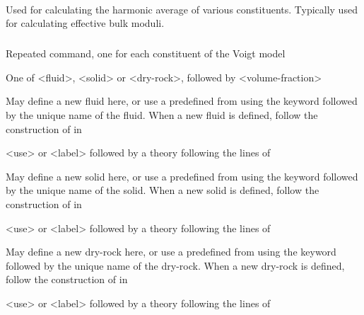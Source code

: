 {\paragraph{}
 \slist
   \item \Description Used for calculating the harmonic average of various constituents. Typically used for calculating effective bulk moduli. 
   \item \Argument
   \item \Default 
 \elist

\subparagraph{}
 \slist
   \item \Description Repeated command, one for each constituent of the Voigt model
   \item \Argument One of <fluid>, <solid> or <dry-rock>, followed by <volume-fraction>
   \item \Default
 \elist

 \slist
   \item \Description May define a new fluid here, or use a predefined  from  using the keyword  followed by the unique name of the fluid. When a new fluid is defined, follow the construction of  in 
   \item \Argument <use> or <label> followed by a theory following the lines of 
   \item \Default
 \elist

 \slist
   \item \Description May define a new solid here, or use a predefined  from  using the keyword  followed by the unique name of the solid. When a new solid is defined, follow the construction of  in 
   \item \Argument <use> or <label> followed by a theory following the lines of 
   \item \Default
 \elist

 \slist
   \item \Description  May define a new dry-rock here, or use a predefined  from  using the keyword  followed by the unique name of the dry-rock. When a new dry-rock is defined, follow the construction of  in 
   \item \Argument <use> or <label> followed by a theory following the lines of 
   \item \Default
 \elist

}
